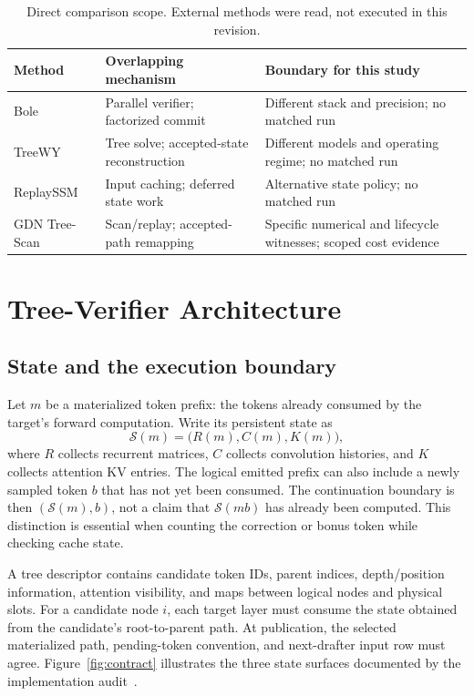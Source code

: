 \documentclass[conference]{IEEEtran}
\newcommand{\sys}{GDN Tree-Scan}
\begin{document}
\begin{table}[t]
\caption{Direct comparison scope. External methods were read, not executed in this revision.}
\label{tab:related}
\centering\footnotesize
\begin{tabularx}{\columnwidth}{@{}>{\raggedright\arraybackslash}p{}YY@{}}
\toprule
Method & Overlapping mechanism & Boundary for this study \\
\midrule
Bole~\cite{wang2026bole} & Parallel verifier; factorized commit & Different stack and precision; no matched run \\
TreeWY~\cite{ghantasala2026treewy} & Tree solve; accepted-state reconstruction & Different models and operating regime; no matched run \\
ReplaySSM~\cite{replayssm2026} & Input caching; deferred state work & Alternative state policy; no matched run \\
\sys{} & Scan/replay; accepted-path remapping & Specific numerical and lifecycle witnesses; scoped cost evidence \\
\bottomrule
\end{tabularx}
\end{table}

\section{Tree-Verifier Architecture}
\label{sec:contract}
\subsection{State and the execution boundary}
Let $m$ be a materialized token prefix: the tokens already consumed by the target's forward computation. Write its persistent state as
\begin{equation}
\mathcal{S}(m)=\bigl(R(m),C(m),K(m)\bigr),
\end{equation}
where $R$ collects recurrent matrices, $C$ collects convolution histories, and $K$ collects attention KV entries. The logical emitted prefix can also include a newly sampled token $b$ that has not yet been consumed. The continuation boundary is then $(\mathcal{S}(m),b)$, not a claim that $\mathcal{S}(mb)$ has already been computed. This distinction is essential when counting the correction or bonus token while checking cache state.

A tree descriptor contains candidate token IDs, parent indices, depth/position information, attention visibility, and maps between logical nodes and physical slots. For a candidate node $i$, each target layer must consume the state obtained from the candidate's root-to-parent path. At publication, the selected materialized path, pending-token convention, and next-drafter input row must agree. Figure~\ref{fig:contract} illustrates the three state surfaces documented by the implementation audit~\cite{lumo2026stateless,lumo2026archive}.
\end{document}
